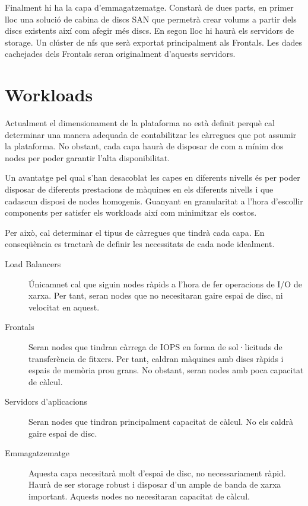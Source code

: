 \documentclass[a4paper, 11pt]{article}
\begin{document}
Finalment hi ha la capa d'emmagatzematge. Constarà de dues parts, en primer lloc una solució de cabina de discs SAN que permetrà crear volums a partir dels discs existents així com afegir més discs. En segon lloc hi haurà els servidors de storage. Un clúster de nfs que serà exportat principalment als Frontals. Les dades cachejades dels Frontals seran originalment d'aquests servidors.


\section{Workloads}

Actualment el dimensionament de la plataforma no està definit perquè cal determinar una manera adequada de contabilitzar les càrregues que pot assumir la plataforma. No obstant, cada capa haurà de disposar de com a mínim dos nodes per poder garantir l'alta disponibilitat.

Un avantatge pel qual s'han desacoblat les capes en diferents nivells és per poder disposar de diferents prestacions de màquines en els diferents nivells i que cadascun disposi de nodes homogenis. Guanyant en granularitat a l'hora d'escollir components per satisfer els workloads així com minimitzar els costos.

Per això, cal determinar el tipus de càrregues que tindrà cada capa. En conseqüència es tractarà de definir les necessitats de cada node idealment.

\begin{description}

\item[Load Balancers] Únicamnet cal que siguin nodes ràpids a l'hora de fer operacions de I/O de xarxa. Per tant, seran nodes que no necesitaran gaire espai de disc, ni velocitat en aquest.

\item[Frontals] Seran nodes que tindran càrrega de IOPS en forma de sol·licituds de transferència de fitxers. Per tant, caldran màquines amb discs ràpids i espais de memòria prou grans. No obstant, seran nodes amb poca capacitat de càlcul.

\item[Servidors d'aplicacions]
Seran nodes que tindran principalment capacitat de càlcul. No els caldrà gaire espai de disc.

\item[Emmagatzematge]
Aquesta capa necesitarà molt d'espai de disc, no necessariament ràpid. Haurà de ser storage robust i disposar d'un ample de banda de xarxa important. Aquests nodes no necesitaran capacitat de càlcul.

\end{description}
\end{document}
